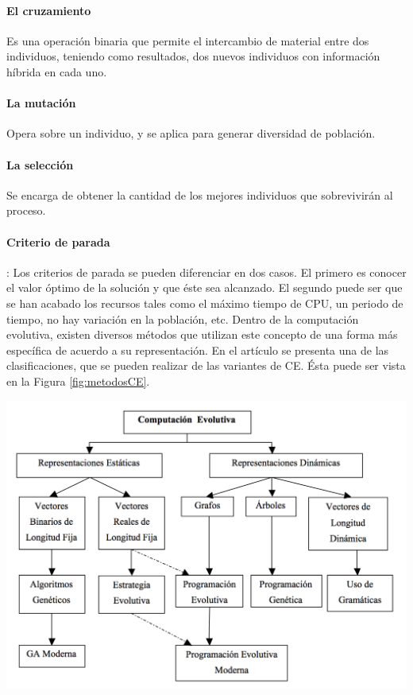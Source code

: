 \paragraph{El cruzamiento} Es una operación binaria que permite el intercambio de material entre dos individuos, teniendo como resultados, dos nuevos individuos con información híbrida en cada uno.

\paragraph{La mutación} Opera sobre un individuo, y se aplica para generar diversidad de población.

\paragraph{La selección} Se encarga de obtener la cantidad de los mejores individuos que sobrevivirán al proceso.

\paragraph{Criterio de parada}: Los criterios de parada se pueden diferenciar en dos casos. El primero es conocer el valor óptimo de la solución y que éste sea alcanzado. El segundo puede ser que se han acabado los recursos tales como el máximo tiempo de CPU, un periodo de tiempo, no hay variación en la población, etc. Dentro de la computación evolutiva, existen diversos métodos que utilizan este concepto de una forma más específica de acuerdo a su representación. En el artículo \citep{kouchakpour_2009} se presenta una de las clasificaciones, que se pueden realizar de las variantes de CE. Ésta puede ser vista en la Figura \ref{fig:metodosCE}.

\begingroup
    \centering
    \includegraphics[width=14cm]{images/cap2/metodosCE.png}
    \label{fig:metodosCE}
\endgroup

